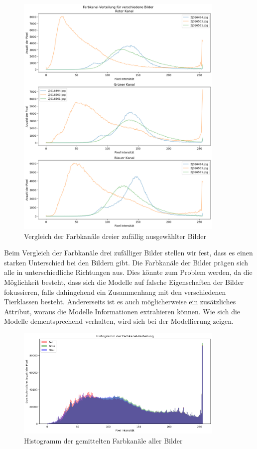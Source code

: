 \documentclass{article}
\begin{document}
\begin{figure}[!h]
    \centering
    \includegraphics[width=10cm]{plots/Hist Farbe Vergleich.png}
    \caption{\label{fig:color_channels_of_3_pictures}Vergleich der Farbkanäle dreier zufällig ausgewählter Bilder}
\end{figure}

\noindent
Beim Vergleich der Farbkanäle drei zufälliger Bilder stellen wir fest, dass es einen starken Unterschied bei den Bildern gibt. Die Farbkanäle der Bilder prägen sich alle in unterschiedliche Richtungen aus. Dies könnte zum Problem werden, da die Möglichkeit besteht, dass sich die Modelle auf falsche Eigenschaften der Bilder fokussieren, falls dahingehend ein Zusammenhang mit den verschiedenen Tierklassen besteht. Andererseits ist es auch möglicherweise ein zusätzliches Attribut, woraus die Modelle Informationen extrahieren können. Wie sich die Modelle dementsprechend verhalten, wird sich bei der Modellierung zeigen. 

\newpage

\begin{figure}[!h]
    \centering
    \includegraphics[width=10cm]{plots/Hist Farbe Mittelwert.png}
    \caption{\label{fig:average_color_channels}Histogramm der gemittelten Farbkanäle aller Bilder}
\end{figure}
\end{document}
